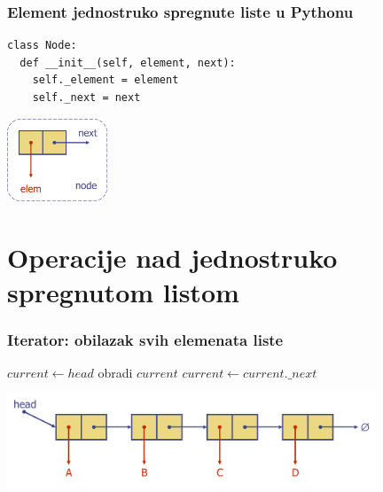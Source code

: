 \documentclass[compress,aspectratio=169]{beamer}
\begin{document}
\begin{frame}[fragile]
  \frametitle{Element jednostruko spregnute liste u Pythonu}
\begin{verbatim}
class Node:
  def __init__(self, element, next):
    self._element = element
    self._next = next
\end{verbatim}
  \begin{center}
    \includegraphics[width=3cm]{asp-07-pic01.png}
  \end{center}
\end{frame}

\section[Operacije]{Operacije nad jednostruko spregnutom listom}
\begin{frame}[fragile]
  \frametitle{Iterator: obilazak svih elemenata liste}
\begin{algorithmic}
\STATE $current \leftarrow head$
  \STATE obradi $current$
  \STATE $current \leftarrow current.\_next$
\ENDWHILE
\end{algorithmic}
  \begin{center}
    \includegraphics[width=11cm]{asp-07-pic02.png}
  \end{center}
\end{frame}
\end{document}
